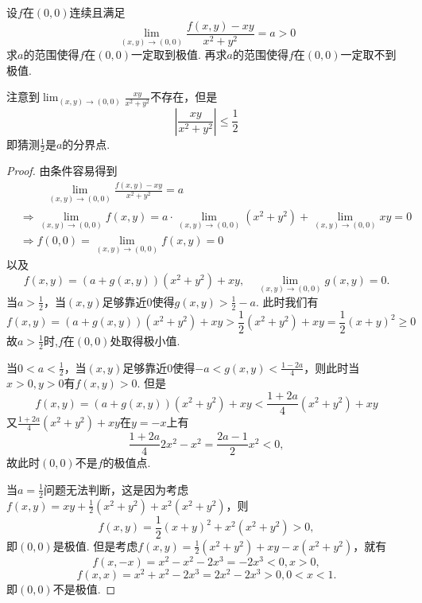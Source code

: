 \documentclass[../../main.tex]{subfiles}%
\begin{document}
\begin{example}
设\(f\)在\((0,0)\)连续且满足
\[
\lim_{(x,y) \to (0,0)} \frac{f(x,y) - xy}{x^2 + y^2} = a > 0
\]
求\(a\)的范围使得\(f\)在\((0,0)\)一定取到极值. 再求\(a\)的范围使得\(f\)在\((0,0)\)一定取不到极值.
\end{example}
\begin{note}
注意到\(\lim_{(x,y) \to (0,0)} \frac{xy}{x^2 + y^2}\)不存在，但是
\[
\left| \frac{xy}{x^2 + y^2} \right| \leqslant \frac{1}{2}
\]
即猜测\(\frac{1}{2}\)是\(a\)的分界点.
\end{note}
\begin{proof}
由条件容易得到
\begin{align*}
&\quad \quad \,\,\underset{\left( x,y \right) \rightarrow \left( 0,0 \right)}{\lim}\frac{f\left( x,y \right) -xy}{x^2+y^2}=a
\\
&\Longrightarrow \underset{\left( x,y \right) \rightarrow \left( 0,0 \right)}{\lim}f\left( x,y \right) =a\cdot \underset{\left( x,y \right) \rightarrow \left( 0,0 \right)}{\lim}\left( x^2+y^2 \right) +\underset{\left( x,y \right) \rightarrow \left( 0,0 \right)}{\lim}xy=0
\\
&\Longrightarrow f(0,0)=\lim_{(x,y)\rightarrow (0,0)} f(x,y)=0
\end{align*}
以及
\[
f(x,y) = (a + g(x,y))(x^2 + y^2) + xy, \quad \lim_{(x,y) \to (0,0)} g(x,y) = 0.
\]
当\(a > \frac{1}{2}\)，当\((x,y)\)足够靠近\(0\)使得\(g(x,y) > \frac{1}{2} - a\). 此时我们有
\[
f(x,y) = (a + g(x,y))(x^2 + y^2) + xy > \frac{1}{2}(x^2 + y^2) + xy = \frac{1}{2}(x + y)^2 \geqslant 0
\]
故\(a > \frac{1}{2}\)时,$f$在$(0,0)$处取得极小值.

当\(0 < a < \frac{1}{2}\)，当\((x,y)\)足够靠近\(0\)使得\(-a < g(x,y) < \frac{1 - 2a}{4}\)，则此时当\(x > 0, y > 0\)有\(f(x,y) > 0\). 但是
\[
f(x,y) = (a + g(x,y))(x^2 + y^2) + xy < \frac{1 + 2a}{4}(x^2 + y^2) + xy
\]
又\(\frac{1 + 2a}{4}(x^2 + y^2) + xy\)在\(y = -x\)上有
\[
\frac{1 + 2a}{4}2x^2 - x^2 = \frac{2a - 1}{2}x^2 < 0,
\]
故此时\((0,0)\)不是$f$的极值点.

当\(a = \frac{1}{2}\)问题无法判断，这是因为考虑\(f(x,y) = xy + \frac{1}{2}(x^2 + y^2) + x^2(x^2 + y^2)\)，则
\[
f(x,y) = \frac{1}{2}(x + y)^2 + x^2(x^2 + y^2) > 0,
\]
即\((0,0)\)是极值. 但是考虑\(f(x,y) = \frac{1}{2}(x^2 + y^2) + xy - x(x^2 + y^2)\)，就有
\[
f(x,-x) = x^2 - x^2 - 2x^3 = -2x^3 < 0, x > 0,
\]
\[
f(x,x) = x^2 + x^2 - 2x^3 = 2x^2 - 2x^3 > 0, 0 < x < 1.
\]
即\((0,0)\)不是极值.
\end{proof}
\end{document}
